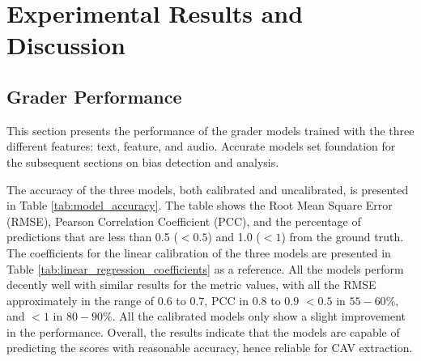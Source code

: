 \chapter{Experimental Results and Discussion} \label{chap:results}

\section{Grader Performance} \label{sec:grader_performance}
This section presents the performance of the grader models trained with the three different features: text, feature, and audio. Accurate models set foundation for the subsequent sections on bias detection and analysis.

The accuracy of the three models, both calibrated and uncalibrated, is presented in Table \ref{tab:model_accuracy}. The table shows the Root Mean Square Error (RMSE), Pearson Correlation Coefficient (PCC), and the percentage of predictions that are less than 0.5 ($< 0.5$) and 1.0 ($< 1$) from the ground truth. The coefficients for the linear calibration of the three models are presented in Table \ref{tab:linear_regression_coefficients} as a reference. All the models perform decently well with similar results for the metric values, with all the RMSE approximately in the range of $0.6$ to $0.7$, PCC in $0.8$ to $0.9$ $< 0.5$ in $55-60\%$, and $< 1$ in $80-90\%$. All the calibrated models only show a slight improvement in the performance. Overall, the results indicate that the models are capable of predicting the scores with reasonable accuracy, hence reliable for CAV extraction.

